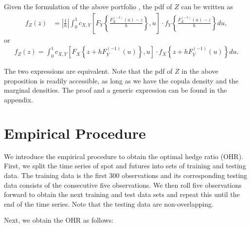 \begin{corollary} Given the formulation of the above portfolio
  , the
  pdf of $Z$ can be written as 
  \begin{align}
  f_{Z}(z) &= \left|\frac{1}{h}\right|\int_0^1 c_{X, Y} \left[
  F_{Y}\left\{\frac{F^{(-1)}_{X}(u)-z}{h}\right\}, u
  \right]
   \cdot
  f_{Y}
  \left\{\frac{F^{(-1)}_{X}(u)-z}{h}\right\} du, \label{eq:density1}
  \end{align} or
    \begin{align}
      f_{Z}(z)
      = \int_0^1 c_{X, Y} \left[
      F_{X}\left\{z + h F^{(-1)}_{Y}(u)\right\}, u
      \right]
       \cdot
      f_{X}
      \left\{
      z+ hF^{(-1)}_{Y}(u)
      \right\} du. \label{eq:density2}
  \end{align}
  \end{corollary}
The two expressions are equivalent.
Note that the pdf of $Z$ in the above proposition is readily
accessible, as long as we have the copula density and the marginal
densities. The proof and a generic expression can be found in the
appendix. \medskip

\section{Empirical Procedure}\label{sec:empirical-procedure}
We introduce the empirical procedure to obtain the optimal hedge ratio (OHR).
First, we split the time series of spot and futures into sets of training and testing data.
The training data is the first 300 observations and its corresponding
testing data consists of the consecutive five observations.
We then roll five observations forward to obtain the next training and
test data sets and repeat this until the end of the time series. 
Note that the testing data are non-overlapping. 

Next, we obtain the OHR as follows:

